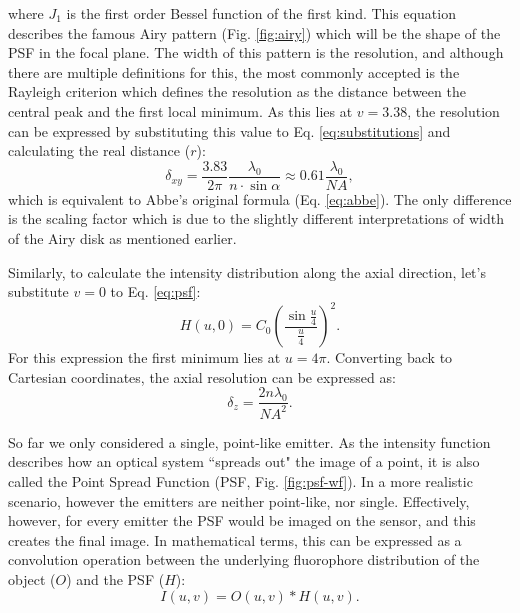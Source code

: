     

    where $J_1$ is the first order Bessel function of the first kind. This equation describes the famous Airy pattern (Fig. \ref{fig:airy}) which will be the shape of the PSF in the focal plane. The width of this pattern is the resolution, and although there are multiple definitions for this, the most commonly accepted is the Rayleigh criterion \cite{f.r.s_xxxi._1879, born_principles_2013} which defines the resolution as the distance between the central peak and the first local minimum. As this lies at $v=3.38$, the resolution can be expressed by substituting this value to Eq. \ref{eq:substitutions} and calculating the real distance ($r$):
    \begin{equation}
      \delta_{xy} = \frac{3.83}{2\pi} \frac{\lambda_0}{n\cdot \sin \alpha} \approx 0.61 \frac{\lambda_0}{NA},
      \label{eq:lateralRes}
    \end{equation}
    which is equivalent to Abbe's original formula (Eq. \ref{eq:abbe}). The only difference is the scaling factor which is due to the slightly different interpretations of width of the Airy disk as mentioned earlier.

    Similarly, to calculate the intensity distribution along the axial direction, let's substitute $v=0$ to Eq. \ref{eq:psf}:
    \begin{equation}
      H(u,0)=C_0\left( \frac{\sin \frac{u}{4}}{\frac{u}{4}}\right) ^2 . 
    \end{equation} 
    For this expression the first minimum lies at $u=4\pi$. Converting back to Cartesian coordinates, the axial resolution can be expressed as:
    \begin{equation}
      \delta_z = \frac{2n\lambda_0}{NA^2}.
      \label{eq:axialRes}
    \end{equation}

    So far we only considered a single, point-like emitter. As the intensity function describes how an optical system ``spreads out" the image of a point, it is also called the Point Spread Function (PSF, Fig. \ref{fig:psf-wf}). In a more realistic scenario, however the emitters are neither point-like, nor single. Effectively, however, for every emitter the PSF would be imaged on the sensor, and this creates the final image. In mathematical terms, this can be expressed as a convolution operation between the underlying fluorophore distribution of the object ($O$) and the PSF ($H$):
    \begin{equation}
      I(u,v) = O(u,v) * H(u,v).
    \end{equation}

